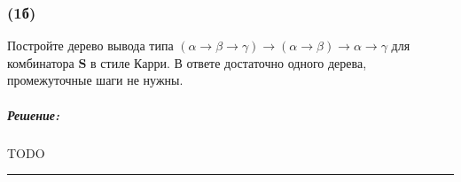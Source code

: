 \documentclass{article}
\newenvironment{proof}{\subparagraph{\hspace{-1em}Решение:\newline}}{\par\noindent\rule{\textwidth}{0.4pt}}
\newcommand{\term}[1]{\mathbf{#1}}
\begin{document}
    \subsubsection{(1б)}

    Постройте дерево вывода типа $(\alpha \to \beta \to \gamma) \to (\alpha \to \beta) \to \alpha \to \gamma$ для комбинатора $\term{S}$ в стиле Карри.
    В ответе достаточно одного дерева, промежуточные шаги не нужны.

    \begin{proof}
        TODO %
    \end{proof}
\end{document}

